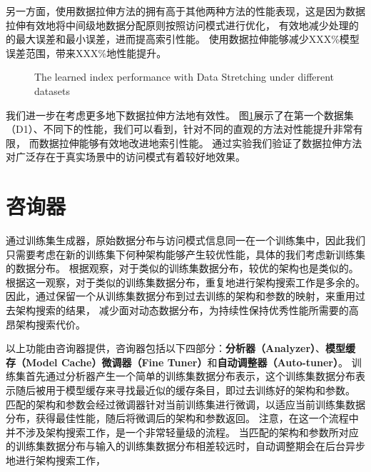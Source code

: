 另一方面，使用数据拉伸方法的{\li}拥有高于其他两种方法的性能表现，这是因为数据拉伸有效地将{\rmi}中间级{\model}地数据分配原则按照访问模式进行优化，
有效地减少处理{\hotkey}的{\model}的最大误差和最小误差，进而提高索引性能。
使用数据拉伸能够减少XXX\%模型误差范围，带来XXX\%地性能提升。

\begin{figure}[!htp]
  \centering
    {The learned index performance with Data Stretching under different datasets}
  \label{fig:stretch-result}
\end{figure}

我们进一步在考虑更多地{\skewwl}下数据拉伸方法地有效性。
图\ref{fig:stretch-result}展示了在第一个数据集（D1）、不同{\skewwl}下{\li}的性能，我们可以看到，针对不同的{\skewwl}直观的方法对性能提升非常有限，
而数据拉伸能够有效地改进{\li}地索引性能。
通过实验我们验证了数据拉伸方法对广泛存在于真实场景中的访问模式有着较好地效果。

\section{咨询器}

通过训练集生成器，原始数据分布与访问模式信息同一在一个训练集中，因此我们只需要考虑在新的训练集下何种{\rmi}架构能够产生较优性能，具体的我们考虑新训练集的数据分布。
根据观察，对于类似的训练集数据分布，较优的{\rmi}架构也是类似的。
根据这一观察，对于类似的训练集数据分布，重复地进行架构搜索工作是多余的。
因此，{\sys}通过保留一个从训练集数据分布到过去训练的{\rmi}架构和参数的映射，来重用过去{\rmi}架构搜索的结果，
减少面对动态数据分布，为持续性保持{\li}优秀性能所需要的高昂架构搜索代价。


以上功能由咨询器提供，咨询器包括以下四部分：\textbf{分析器（Analyzer）}、\textbf{模型缓存（Model Cache）}\textbf{微调器（Fine Tuner）}和\textbf{自动调整器（Auto-tuner）}。
训练集首先通过分析器产生一个简单的训练集数据分布表示，这个训练集数据分布表示随后被用于模型缓存来寻找最近似的缓存条目，即过去训练好的{\rmi}架构和参数。
匹配的{\rmi}架构和参数会经过微调器针对当前训练集进行微调，以适应当前训练集数据分布，获得最佳性能，随后将微调后的{\rmi}架构和参数返回。
注意，在这一个流程中并不涉及架构搜索工作，是一个非常轻量级的流程。
当匹配的{\rmi}架构和参数所对应的训练集数据分布与输入的训练集数据分布相差较远时，自动调整期会在后台异步地进行架构搜索工作，

